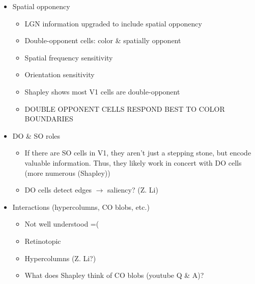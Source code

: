 \documentclass[journal,onecolumn]{IEEEtran}
\begin{document}
\begin{enumerate}
\begin{itemize}
\begin{itemize}
                \end{itemize}
            \item Spatial opponency
                \begin{itemize}
                    \item LGN information upgraded to include spatial opponency
                    \item Double-opponent cells: color \& spatially opponent
                    \item Spatial frequency sensitivity
                    \item Orientation sensitivity
                    \item Shapley shows most V1 cells are double-opponent
                    \item DOUBLE OPPONENT CELLS RESPOND BEST TO COLOR BOUNDARIES
                \end{itemize}
            \item DO \& SO roles
                \begin{itemize}
                    \item If there are SO cells in V1, they aren't just a stepping stone, but encode valuable information. Thus, they likely work in concert with DO cells (more numerous (Shapley))
                    \item DO cells detect edges $\rightarrow$ saliency? (Z. Li)
                \end{itemize}
            \item Interactions (hypercolumns, CO blobs, etc.)
                \begin{itemize}
                    \item Not well understood =(
                    \item Retinotopic
                    \item Hypercolumns (Z. Li?)
                    \item What does Shapley think of CO blobs (youtube Q \& A)?
                \end{itemize}
        \end{itemize}
\end{enumerate}
\end{document}
